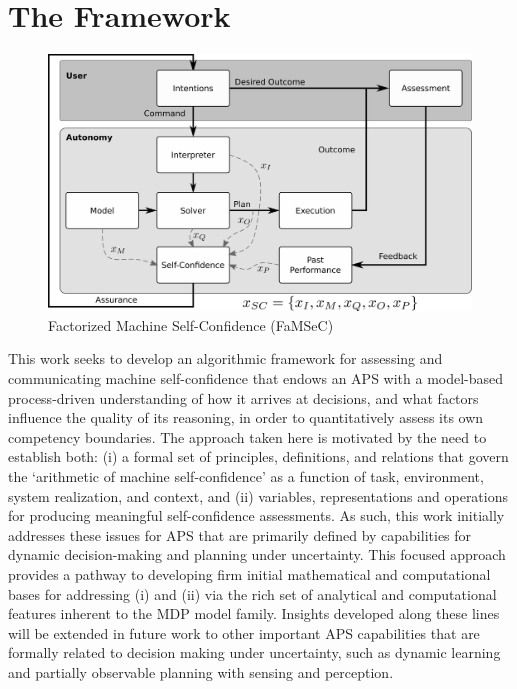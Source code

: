\section{The {\famsec} Framework}
    \begin{figure}[tbp]
        \centering
        \includegraphics[width=0.95\linewidth]{Figures/FaMSeC.png}
        \caption{Factorized Machine Self-Confidence (FaMSeC)}
        \label{fig:famsec}
    \end{figure}
    
    This work seeks to develop an algorithmic framework for assessing and communicating machine self-confidence that endows an APS with a model-based process-driven understanding of how it arrives at decisions, and what factors influence the quality of its reasoning, in order to quantitatively assess its own competency boundaries. The approach taken here is motivated by the need to establish both: (i) a formal set of principles, definitions, and relations that govern the `arithmetic of machine self-confidence' as a function of task, environment, system realization, and context, and (ii) variables, representations and operations for producing meaningful self-confidence assessments. As such, this work initially addresses these issues for APS that are primarily defined by capabilities for dynamic decision-making and planning under uncertainty. This focused approach provides a pathway to developing firm initial mathematical and computational bases for addressing (i) and (ii) via the rich set of analytical and computational features inherent to the MDP model family. Insights developed along these lines will be extended in future work to other important APS capabilities that are formally related to decision making under uncertainty, such as dynamic learning and partially observable planning with sensing and perception. 
    
